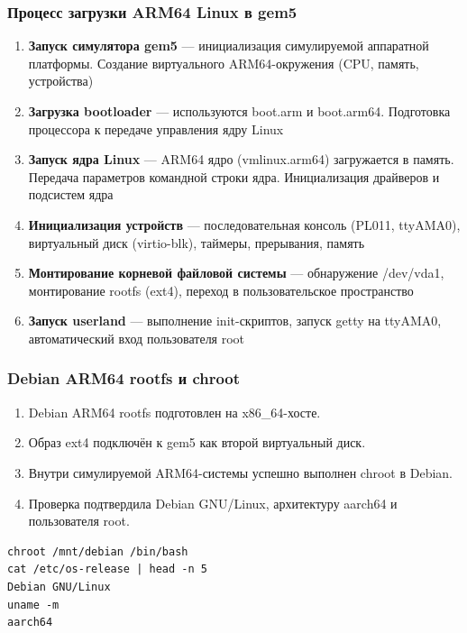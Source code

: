 \documentclass{beamer}
\begin{document}
\begin{frame}[shrink=5]
\frametitle{Процесс загрузки ARM64 Linux в gem5}
\begin{enumerate}
    \item \textbf{Запуск симулятора gem5} --- инициализация симулируемой аппаратной платформы. Создание виртуального ARM64-окружения (CPU, память, устройства)
    \item \textbf{Загрузка bootloader} --- используются boot.arm и boot.arm64. Подготовка процессора к передаче управления ядру Linux
    \item \textbf{Запуск ядра Linux} --- ARM64 ядро (vmlinux.arm64) загружается в память. Передача параметров командной строки ядра. Инициализация драйверов и подсистем ядра
    \item \textbf{Инициализация устройств} --- последовательная консоль (PL011, ttyAMA0), виртуальный диск (virtio-blk), таймеры, прерывания, память
    \item \textbf{Монтирование корневой файловой системы} --- обнаружение /dev/vda1, монтирование rootfs (ext4), переход в пользовательское пространство
    \item \textbf{Запуск userland} --- выполнение init-скриптов, запуск getty на ttyAMA0, автоматический вход пользователя root
\end{enumerate}
\end{frame}

\begin{frame}[fragile]
\frametitle{Debian ARM64 rootfs и chroot}
\begin{enumerate}
    \item Debian ARM64 rootfs подготовлен на x86\_64-хосте.
    \item Образ ext4 подключён к gem5 как второй виртуальный диск.
    \item Внутри симулируемой ARM64-системы успешно выполнен chroot в Debian.
    \item Проверка подтвердила Debian GNU/Linux, архитектуру aarch64 и пользователя root.
\end{enumerate}
\medskip
\begin{lstlisting}[basicstyle=\small\ttfamily,frame=none]
chroot /mnt/debian /bin/bash
cat /etc/os-release | head -n 5
Debian GNU/Linux
uname -m
aarch64
\end{lstlisting}
\end{frame}
\end{document}
